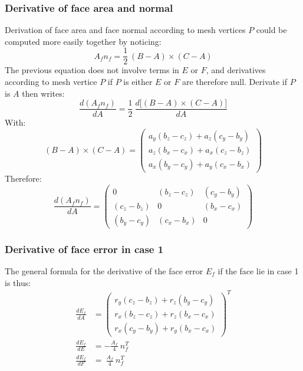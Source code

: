 \documentclass[11pt]{article}
\begin{document}
\subsubsection{Derivative of face area and normal}

Derivation of face area and face normal according to mesh vertices $P$ could be computed more easily together by noticing:
\begin{equation}
A_f n_f = \frac{1}{2} \ (B-A)\times(C-A) 
\end{equation}
The previous equation does not involve terms in $E$ or $F$, and derivatives according to mesh vertice $P$ if $P$ is either $E$ or $F$ are therefore null. Derivate if $P$ is $A$ then writes:
\begin{equation}
\frac{d (A_f n_f)}{dA} = \frac{1}{2}\ \frac{d \big[(B-A)\times(C-A)\big]}{dA}
\end{equation}
With:
\begin{equation}
(B-A)\times(C-A) = 
\begin{pmatrix}
a_y(b_z-c_z) + a_z(c_y-b_y) \\
a_z(b_x-c_x) + a_x(c_z-b_z) \\
a_x(b_y-c_y) + a_y(c_x-b_x)
\end{pmatrix}
\end{equation}
Therefore:
\begin{equation}
\frac{d (A_f n_f)}{dA} =
\begin{pmatrix}
0 & (b_z-c_z) & (c_y-b_y) \\
(c_z-b_z) & 0 & (b_x-c_x) \\
(b_y-c_y) & (c_x-b_x) & 0
\end{pmatrix}
\end{equation}

\subsubsection{Derivative of face error in case 1}

The general formula for the derivative of the face error $E_f$ if the face lie in case 1 is thus:
\begin{subequations}
\begin{align}
\frac{d E_f}{d A} &= 
\begin{pmatrix}
r_y(c_z-b_z) + r_z(b_y-c_y)\\
r_x(b_z-c_z) + r_z(b_x-c_x) \\
r_x(c_y-b_y) + r_y(b_x-c_x)
\end{pmatrix}^T
 \\
\frac{d E_f}{d E} &= - \frac{A_f }{4}\ n_f^T \\
\frac{d E_f}{d F} &= \ \frac{A_f }{4}\ n_f^T
\end{align}
\end{subequations} 
\end{document}
